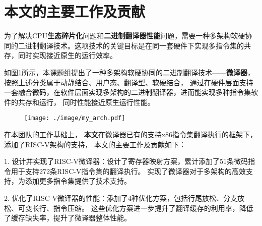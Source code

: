 \section{本文的主要工作及贡献}

为了解决CPU\textbf{生态碎片化}问题和\textbf{二进制翻译器性能}问题，需要一种多架构软硬协同的二进制翻译技术。这项技术的关键目标是在同一套硬件下实现多指令集的共存，同时实现接近原生的运行效率。

如图\ref{img:my_arch}所示，本课题组提出了一种多架构软硬协同的二进制翻译技术——\textbf{微译器}，按照上述分类属于动静结合、用户态、翻译型、软硬结合，
通过在硬件层面支持一套融合微码，在软件层面实现多架构的二进制翻译器，进而能实现多种指令集软件的共存和运行，
同时性能接近原生运行性能。


\begin{figure}[!htbp]
    \centering
    \texttt{[image: ./image/my\_arch.pdf]}
    \label{img:my_arch}
  \end{figure}





在本团队的工作基础上，
\textbf{本文}在微译器已有的支持x86指令集翻译执行的框架下，添加了RISC-V架构的支持，
本文的主要工作及贡献如下：

1. 设计并实现了RISC-V微译器：设计了寄存器映射方案，累计添加了51条微码指令用于支持272条RISC-V指令集的翻译执行。
实现了微译器对于多架构的高效支持，为添加更多指令集提供了技术支持。

2. 优化了RISC-V微译器的性能：添加了4种优化方案，包括行尾放松、分支放松、可变长行、指令压缩。
这些优化方案进一步提升了翻译缓存的利用率，降低了缓存缺失率，提升了微译器整体性能。

